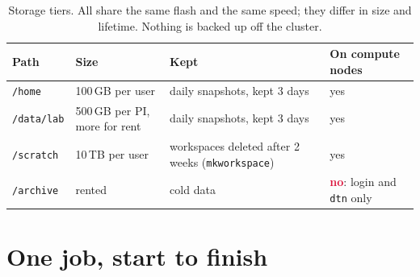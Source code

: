 \documentclass[10pt,letterpaper]{article}
\begin{document}
\begin{table}[H]
\small
\begin{tabularx}{\textwidth}{@{}l l X l@{}}
\toprule
\textbf{Path} & \textbf{Size} & \textbf{Kept} & \textbf{On compute nodes}\\
\midrule
\texttt{/home} & 100\,GB per user & daily snapshots, kept 3 days & yes\\
\texttt{/data/lab} & 500\,GB per PI, more for rent & daily snapshots, kept 3 days & yes\\
\texttt{/scratch} & 10\,TB per user & workspaces deleted after 2 weeks (\texttt{mkworkspace}) & yes\\
\texttt{/archive} & rented & cold data & \textcolor{crimson}{\textbf{no}}: login and \texttt{dtn} only\\
\bottomrule
\end{tabularx}
\caption{Storage tiers. All share the same flash and the same speed; they differ in size and lifetime. Nothing is backed up off the cluster.}
\end{table}

\section{One job, start to finish}
\end{document}
